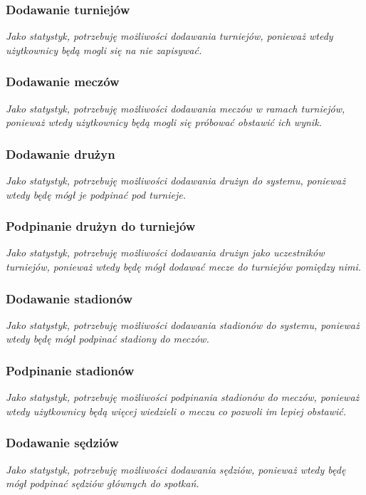 \documentclass{mwrep}
\begin{document}
\subsubsection{Dodawanie turniejów}
\emph{Jako statystyk, potrzebuję możliwości dodawania turniejów, ponieważ wtedy użytkownicy będą mogli się na nie zapisywać.}

\subsubsection{Dodawanie meczów}
\emph{Jako statystyk, potrzebuję możliwości dodawania meczów w ramach turniejów, ponieważ wtedy użytkownicy będą mogli się próbować obstawić ich wynik.}

\subsubsection{Dodawanie drużyn}
\emph{Jako statystyk, potrzebuję możliwości dodawania drużyn do systemu, ponieważ wtedy będę mógł je podpinać pod turnieje.}

\subsubsection{Podpinanie drużyn do turniejów}
\emph{Jako statystyk, potrzebuję możliwości dodawania drużyn jako uczestników turniejów, ponieważ wtedy będę mógł dodawać mecze do turniejów pomiędzy nimi.}

\subsubsection{Dodawanie stadionów}
\emph{Jako statystyk, potrzebuję możliwości dodawania stadionów do systemu, ponieważ wtedy będę mógł podpinać stadiony do meczów.}

\subsubsection{Podpinanie stadionów}
\emph{Jako statystyk, potrzebuję możliwości podpinania stadionów do meczów, ponieważ wtedy użytkownicy będą więcej wiedzieli o meczu co pozwoli im lepiej obstawić.}

\subsubsection{Dodawanie sędziów}
\emph{Jako statystyk, potrzebuję możliwości dodawania sędziów, ponieważ wtedy będę mógł podpinać sędziów głównych do spotkań.}
\end{document}
